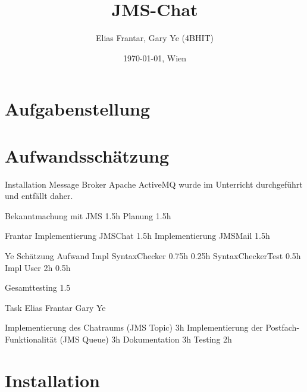 \documentclass[11pt, a4paper]{article}
\title{JMS-Chat}
\author{Elias Frantar, Gary Ye (4BHIT)}
\date{\today{}, Wien}
\begin{document}
\lstset{basicstyle=\ttfamily\small,
        keywordstyle=,
        commentstyle=\itshape,
        numbers=left,                   %
        stepnumber=1,					%
        linebreak=true,					%
        numberstyle=\tiny,				%
        showstringspaces=false,			
        abovecaptionskip=0pt,
        belowcaptionskip=0pt,
        xleftmargin=\parindent,
        fontadjust}

\maketitle
\newpage
\tableofcontents
\newpage

\section{Aufgabenstellung}

\section{Aufwandsschätzung}
Installation Message Broker Apache ActiveMQ wurde im Unterricht durchgeführt und entfällt daher.

Bekanntmachung mit JMS 1.5h
Planung 1.5h

Frantar
Implementierung JMSChat 1.5h
Implementierung JMSMail 1.5h

Ye Schätzung Aufwand
Impl SyntaxChecker 0.75h 0.25h
SyntaxCheckerTest 0.5h 
Impl User 2h 0.5h

Gesamttesting 1.5

Task Elias Frantar Gary Ye



Implementierung des Chatraums (JMS Topic) 3h
Implementierung der Postfach-Funktionalität (JMS Queue) 3h
Dokumentation 3h
Testing 2h
\section{Installation}
\end{document}
